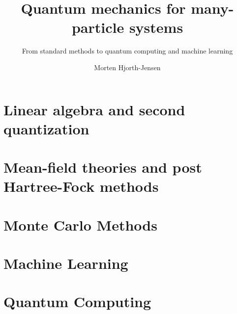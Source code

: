 \documentclass[graybox,envcountchap,sectrefs]{svmono}
\begin{document}
\author{Morten Hjorth-Jensen}
\title{Quantum mechanics for many-particle systems}
\subtitle{From standard methods to quantum computing and machine learning}
\maketitle

\frontmatter%






\tableofcontents




\mainmatter%
 \part{Linear algebra and second quantization}
         
 \clearemptydoublepage
         
 \clearemptydoublepage
      
 \part{Mean-field theories and post Hartree-Fock methods}
\clearemptydoublepage
      
\clearemptydoublepage

\part{Monte Carlo Methods}

 \clearemptydoublepage

 \clearemptydoublepage

 \clearemptydoublepage

 \clearemptydoublepage


\part{Machine Learning}

%
\part{Quantum Computing}   

 

\backmatter%
%
%
\printindex
\end{document}
